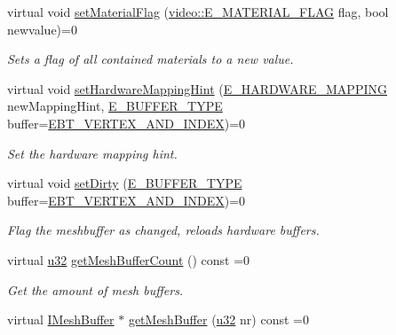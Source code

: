\begin{DoxyCompactItemize}
virtual void \hyperlink{classirr_1_1scene_1_1IMesh_a56e034b671f52653d6c91e0ffa42febd}{set\+Material\+Flag} (\hyperlink{namespaceirr_1_1video_a8a3bc00ae8137535b9fbc5f40add70d3}{video\+::\+E\+\_\+\+M\+A\+T\+E\+R\+I\+A\+L\+\_\+\+F\+L\+AG} flag, bool newvalue)=0
\begin{DoxyCompactList}\small\item\em Sets a flag of all contained materials to a new value. \end{DoxyCompactList}\item 
virtual void \hyperlink{classirr_1_1scene_1_1IMesh_a1de908b8e67c28bdac546e8599043dfe}{set\+Hardware\+Mapping\+Hint} (\hyperlink{namespaceirr_1_1scene_ac7d8ee8d77da75f2580bb9bb17231c27}{E\+\_\+\+H\+A\+R\+D\+W\+A\+R\+E\+\_\+\+M\+A\+P\+P\+I\+NG} new\+Mapping\+Hint, \hyperlink{namespaceirr_1_1scene_a8f59a89ffef0ad8e5b2c2cb874a93e8c}{E\+\_\+\+B\+U\+F\+F\+E\+R\+\_\+\+T\+Y\+PE} buffer=\hyperlink{namespaceirr_1_1scene_a8f59a89ffef0ad8e5b2c2cb874a93e8ca34ea664123fbc28610408e51b014dcdd}{E\+B\+T\+\_\+\+V\+E\+R\+T\+E\+X\+\_\+\+A\+N\+D\+\_\+\+I\+N\+D\+EX})=0
\begin{DoxyCompactList}\small\item\em Set the hardware mapping hint. \end{DoxyCompactList}\item 
virtual void \hyperlink{classirr_1_1scene_1_1IMesh_a496534cd4813d520d887785720f66c9b}{set\+Dirty} (\hyperlink{namespaceirr_1_1scene_a8f59a89ffef0ad8e5b2c2cb874a93e8c}{E\+\_\+\+B\+U\+F\+F\+E\+R\+\_\+\+T\+Y\+PE} buffer=\hyperlink{namespaceirr_1_1scene_a8f59a89ffef0ad8e5b2c2cb874a93e8ca34ea664123fbc28610408e51b014dcdd}{E\+B\+T\+\_\+\+V\+E\+R\+T\+E\+X\+\_\+\+A\+N\+D\+\_\+\+I\+N\+D\+EX})=0
\begin{DoxyCompactList}\small\item\em Flag the meshbuffer as changed, reloads hardware buffers. \end{DoxyCompactList}\item 
virtual \hyperlink{namespaceirr_a0416a53257075833e7002efd0a18e804}{u32} \hyperlink{classirr_1_1scene_1_1IMesh_a2ebed0bdae2d6537c36b0b7ac831edb8}{get\+Mesh\+Buffer\+Count} () const =0
\begin{DoxyCompactList}\small\item\em Get the amount of mesh buffers. \end{DoxyCompactList}\item 
virtual \hyperlink{classirr_1_1scene_1_1IMeshBuffer}{I\+Mesh\+Buffer} $\ast$ \hyperlink{classirr_1_1scene_1_1IMesh_a2cd1a04b396235101f426befba0c5b82}{get\+Mesh\+Buffer} (\hyperlink{namespaceirr_a0416a53257075833e7002efd0a18e804}{u32} nr) const =0

\end{DoxyCompactItemize}
